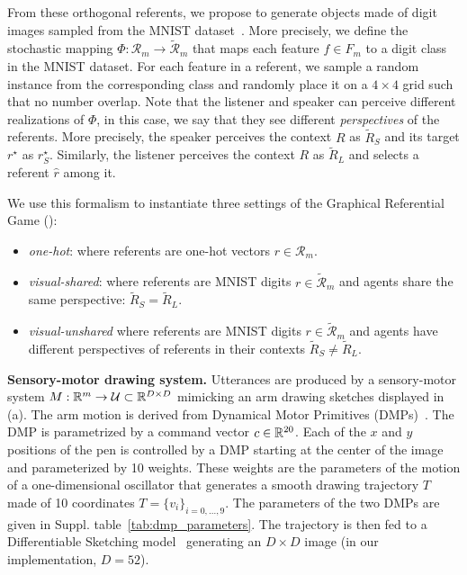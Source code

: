 From these orthogonal referents, we propose to generate objects made of digit images sampled from the MNIST dataset~\citep{LeCun1998GradientbasedLA}. More precisely, we define the stochastic mapping $\Phi: \mathcal{R}_m \rightarrow \tilde{\mathcal{R}}_m$ that maps each feature $f \in F_m$ to a digit class in the MNIST dataset. For each feature in a referent, we sample a random instance from the corresponding class and randomly place it on a $4\times4$ grid such that no number overlap. Note that the listener and speaker can perceive different realizations of $\Phi$, in this case, we say that they see different \textit{perspectives} of the referents. More precisely, the speaker perceives the context $R$ as $\tilde{R}_S$ and its target $r^\star$ as $r^\star_S$. Similarly, the listener perceives the context $R$ as $\tilde{R}_L$ and selects a referent $\hat{r}$ among it.

We use this formalism to instantiate three settings of the Graphical Referential Game (\greg):
\begin{itemize}[noitemsep,topsep=0pt]
    \item \textit{one-hot}: where referents are one-hot vectors $r \in \mathcal{R}_m$.
    \item \textit{visual-shared}: where referents are MNIST digits $r \in \tilde{\mathcal{R}}_m$ and agents share the same perspective: $\tilde{R}_S = \tilde{R}_L$.
    \item \textit{visual-unshared} where referents are MNIST digits $r \in \tilde{\mathcal{R}}_m$ and agents have different perspectives of referents in their contexts $\tilde{R}_S \neq \tilde{R}_L$.
\end{itemize}


\noindent\textbf{Sensory-motor drawing system.} 
Utterances are produced by a sensory-motor system ${M: \mathbb{R}^m \rightarrow \mathcal{U} \subset \mathbb{R}^{D\times D}}$ mimicking an arm drawing sketches displayed in (a). The arm motion is derived from Dynamical Motor Primitives (DMPs)~\citep{schaal2006dynamic}. The DMP is parametrized by a command vector $c\in\mathbb{R}^{20}$. Each of the $x$ and $y$ positions of the pen is controlled by a DMP starting at the center of the image and parameterized by 10 weights. These weights are the parameters of the motion of a one-dimensional oscillator that generates a smooth drawing trajectory $T$ made of 10 coordinates $T=\{v_i\}_{i=0,...,9}$. The parameters of the two DMPs are given in Suppl. table~\ref{tab:dmp_parameters}. The trajectory is then fed to a Differentiable Sketching model~\citep{Mihai2021DifferentiableDA} generating an $D\times D$ image (in our implementation, $D=52$). %

